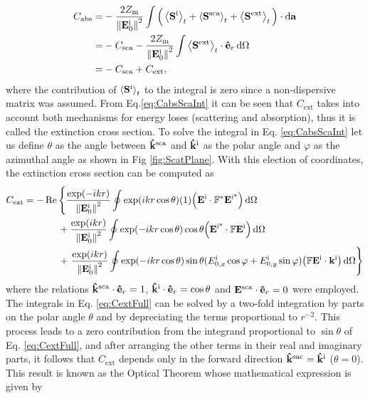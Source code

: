 %
\begin{align}
C_\text{abs} = & - \frac{2Z_\text{m}}{\norm{\vb{E}^\text{i}_0}^2}\int\Big(\ev{\vb{S}^\text{i}}_t + \ev{\vb{S}^\text{sca}}_t + \ev{\vb{S}^\text{ext}}_t\Big)\cdot\dd{\vb{a}}
					\notag \\
			=  & - C_\text{sca} - \frac{2Z_\text{m}}{\norm{\vb{E}_0^\text{i}}^2}\int   \ev{\vb{S}^\text{ext}}_t\cdot \vu{e}_r\dd{\Omega}
					\notag \\
			= & -C_\text{sca} + C_\text{ext},
\label{eq:CabsScaInt}
\end{align}
%
where the contribution of $\ev{\vb{S}^\text{i}}_t$ to the integral is zero since a non-dispersive matrix was assumed. From Eq.\eqref{eq:CabsScaInt} it can be seen that $C_\text{ext}$ takes into account both mechanisms for energy loses (scattering and absorption), thus it is called the extinction cross section. To solve the integral in Eq. \eqref{eq:CabsScaInt} let us define $\theta$ as the angle between $\vu{k}^\text{sca}$ and $\vu{k}^\text{i}$ as the polar angle  and  $\varphi$ as the azimuthal angle as shown in Fig \ref{fig:ScatPlane}. With this election of coordinates,  the extinction cross section can be computed as
%
\begin{align}
C_\text{ext} = - &\Re \left\{
			 \frac{\exp(-ikr) }{\norm{\vb{E}_0^\text{i}}^2}
			 					\oint \exp(ikr\cos\theta)(1)\qty(\vb{E}^\text{i}\cdot \mathbb{F}^*\vb{E}^\text{i*})  \dd{\Omega} \right.	\notag\\
			&\hspace*{1.5em}+\frac{\exp(ikr) }{\norm{\vb{E}_0^\text{i}}^2}
								\oint \exp(-ikr\cos\theta)\cos\theta \qty(\vb{E}^\text{i*}\cdot \mathbb{F}\vb{E}^\text{i})     \dd{\Omega}
\label{eq:CextFull}\\
			&\hspace*{1.5em}+\left.\frac{\exp(ikr) }{\norm{\vb{E}^\text{i}_0}^2}
								\oint \exp(-ikr\cos\theta)\sin\theta(E_{0,x}^\text{i}\cos\varphi+E_{0,y}^\text{i}\sin\varphi)
									\qty(\mathbb{F}\vb{E}^\text{i}\cdot\vb{k}^\text{i})    \dd{\Omega}  \right\} \notag
\end{align}
%
where the relations $\vu{k}^\text{sca}\cdot\vu{e}_r = 1$, $\vu{k}^\text{i}\cdot\vu{e}_r = \cos\theta$ and  $\vb{E}^\text{sca}\cdot\vu{e}_r = 0$ were employed. The integrals in Eq. \eqref{eq:CextFull} can be solved by a two-fold integration by parts on the polar angle $\theta$ and by depreciating the terms proportional to $r^{-2}$. This process leads to a zero contribution from the integrand proportional to $\sin\theta$  of Eq. \eqref{eq:CextFull}, and after arranging the other terms in their real and imaginary parts, it follows that $C_\text{ext}$ depends only in the forward direction  $\vu{k}^\text{sac} = \vu{k}^\text{i}$ ($\theta =0$). This result is known as the Optical Theorem whose mathematical expression is given by \cite{tsang_scattering_2000,pellarin_forward_2019,newton_optical_1976}
